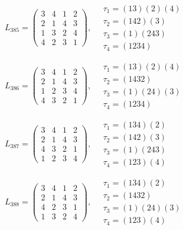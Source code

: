 $L_{385} = \begin{pmatrix} 3 & 4 & 1 & 2 \\ 2 & 1 & 4 & 3 \\ 1 & 3 & 2 & 4 \\ 4 & 2 & 3 & 1 \end{pmatrix}, \quad \begin{matrix} \tau_{1} = (1 3)(2)(4) \\ \tau_{2} = (1 4 2)(3) \\ \tau_{3} = (1)(2 4 3) \\ \tau_{4} = (1 2 3 4) \end{matrix}$

$L_{386} = \begin{pmatrix} 3 & 4 & 1 & 2 \\ 2 & 1 & 4 & 3 \\ 1 & 2 & 3 & 4 \\ 4 & 3 & 2 & 1 \end{pmatrix}, \quad \begin{matrix} \tau_{1} = (1 3)(2)(4) \\ \tau_{2} = (1 4 3 2) \\ \tau_{3} = (1)(2 4)(3) \\ \tau_{4} = (1 2 3 4) \end{matrix}$

$L_{387} = \begin{pmatrix} 3 & 4 & 1 & 2 \\ 2 & 1 & 4 & 3 \\ 4 & 3 & 2 & 1 \\ 1 & 2 & 3 & 4 \end{pmatrix}, \quad \begin{matrix} \tau_{1} = (1 3 4)(2) \\ \tau_{2} = (1 4 2)(3) \\ \tau_{3} = (1)(2 4 3) \\ \tau_{4} = (1 2 3)(4) \end{matrix}$

$L_{388} = \begin{pmatrix} 3 & 4 & 1 & 2 \\ 2 & 1 & 4 & 3 \\ 4 & 2 & 3 & 1 \\ 1 & 3 & 2 & 4 \end{pmatrix}, \quad \begin{matrix} \tau_{1} = (1 3 4)(2) \\ \tau_{2} = (1 4 3 2) \\ \tau_{3} = (1)(2 4)(3) \\ \tau_{4} = (1 2 3)(4) \end{matrix}$

